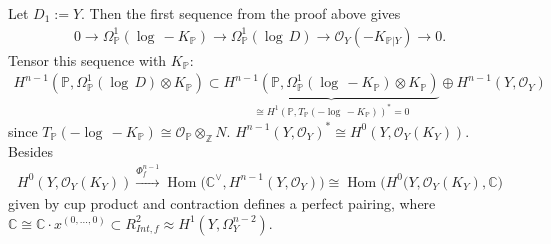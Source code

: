 \documentclass[12pt, english]{article}
\DeclareMathOperator{\Hom}{Hom}
\begin{document}
Let $D_1 := Y$. Then the first sequence from the proof above gives
\begin{align*}
	0 \rightarrow \Omega_{\mathbb{P}}^1(\log \, -K_{\mathbb{P}}) \rightarrow \Omega_{\mathbb{P}}^1(\log \, D) \rightarrow \mathcal{O}_Y(-K_{\mathbb{P} \vert{Y}}) \rightarrow 0.
\end{align*}
Tensor this sequence with $K_{\mathbb{P}}$:
\begin{align*}
	H^{n-1}(\mathbb{P}, \Omega_{\mathbb{P}}^1(\log \, D) \otimes K_{\mathbb{P}}) \subset \underbrace{H^{n-1}(\mathbb{P}, \Omega_{\mathbb{P}}^1(\log \, -K_{\mathbb{P}}) \otimes K_{\mathbb{P}})}_{\cong H^1(\mathbb{P}, T_{\mathbb{P}}(-\log \, -K_{\mathbb{P}}))^*=0} \oplus H^{n-1}(Y, \mathcal{O}_Y)
\end{align*}
since $T_{\mathbb{P}}(-\log \, -K_{\mathbb{P}}) \cong \mathcal{O}_{\mathbb{P}} \otimes_{\mathbb{Z}} N$. $H^{n-1}(Y,\mathcal{O}_Y)^* \cong H^0(Y,\mathcal{O}_Y(K_Y))$. Besides
\begin{align*}
	H^{0}(Y,\mathcal{O}_Y(K_Y)) \overset{\Phi_f^{n-1}}{\rightarrow} \Hom \Big( \mathbb{C}^{\vee}, H^{n-1}(Y,\mathcal{O}_Y) \Big) \cong \Hom \Big( H^0(Y,\mathcal{O}_Y(K_Y), \mathbb{C} \Big)
\end{align*}
given by cup product and contraction defines a perfect pairing, where $\mathbb{C} \cong \mathbb{C} \cdot x^{(0,...,0)} \subset R_{Int,f}^2 \approx H^1(Y, \Omega_Y^{n-2})$.
\end{document}
